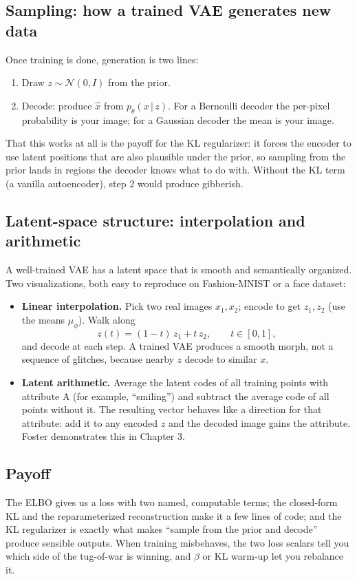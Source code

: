 \documentclass[11pt]{article}
\newcommand{\given}{\,\vert\,}
\theoremstyle{remark}
\begin{document}
\subsection{Sampling: how a trained VAE generates new data}
Once training is done, generation is two lines:
\begin{enumerate}[leftmargin=1.6em]
  \item Draw $z\sim\mathcal N(0,I)$ from the prior.
  \item Decode: produce $\hat x$ from $p_\theta(x\given z)$. For a Bernoulli decoder the per-pixel probability is your image; for a Gaussian decoder the mean is your image.
\end{enumerate}
That this works at all is the payoff for the KL regularizer: it forces the encoder to use latent positions that are also plausible under the prior, so sampling from the prior lands in regions the decoder knows what to do with. Without the KL term (a vanilla autoencoder), step 2 would produce gibberish.

\subsection{Latent-space structure: interpolation and arithmetic}
A well-trained VAE has a latent space that is smooth and semantically organized. Two visualizations, both easy to reproduce on Fashion-MNIST or a face dataset:
\begin{itemize}[leftmargin=1.2em]
  \item \textbf{Linear interpolation.} Pick two real images $x_1,x_2$; encode to get $z_1,z_2$ (use the means $\mu_\phi$). Walk along
  \[
  z(t) = (1-t)\,z_1 + t\,z_2,\qquad t\in[0,1],
  \]
  and decode at each step. A trained VAE produces a smooth morph, not a sequence of glitches, because nearby $z$ decode to similar $x$.
  \item \textbf{Latent arithmetic.} Average the latent codes of all training points with attribute A (for example, ``smiling'') and subtract the average code of all points without it. The resulting vector behaves like a direction for that attribute: add it to any encoded $z$ and the decoded image gains the attribute. Foster demonstrates this in Chapter 3.
\end{itemize}

\subsection{Payoff}
The ELBO gives us a loss with two named, computable terms; the closed-form KL and the reparameterized reconstruction make it a few lines of code; and the KL regularizer is exactly what makes ``sample from the prior and decode'' produce sensible outputs. When training misbehaves, the two loss scalars tell you which side of the tug-of-war is winning, and $\beta$ or KL warm-up let you rebalance it.
\end{document}
